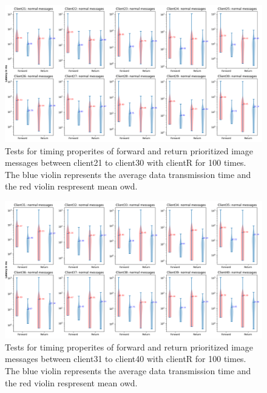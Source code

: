 \begin{figure}
    \includegraphics[width=\textheight]{figures/appendix/priority_tests/log_violin_50clients_image_figure_3.png}\hfill 
    \caption{Tests for timing properites of forward and return prioritized image messages between client21 to client30 
    with clientR for 100 times. The blue violin represents the average data transmission time and the red violin 
    respresent mean \gls{owd}.} \label{fig: priority-50clients-image-c}
\end{figure}

\begin{figure}
    \includegraphics[width=\textheight]{figures/appendix/priority_tests/log_violin_50clients_image_figure_4.png}\hfill 
    \caption{Tests for timing properites of forward and return prioritized image messages between client31 to client40 
    with clientR for 100 times. The blue violin represents the average data transmission time and the red violin 
    respresent mean \gls{owd}.} \label{fig: priority-50clients-image-d}
\end{figure}

